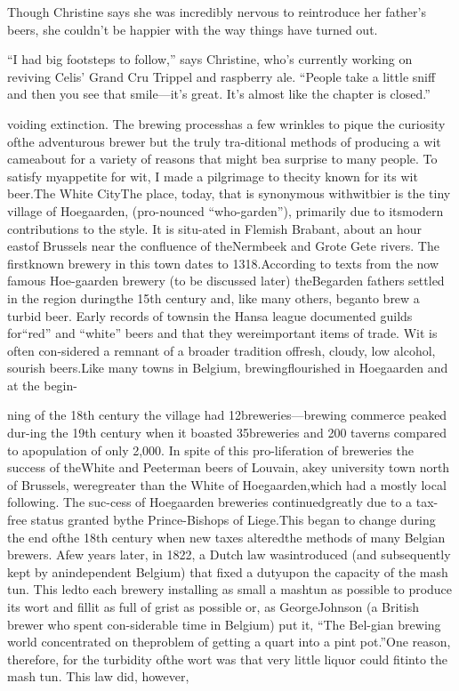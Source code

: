\documentclass[a4paper,parskip=half]{scrartcl}
\begin{document}
Though Christine says she was incredibly nervous to reintroduce her father’s beers, she couldn’t be happier with the way things have turned out.

“I had big footsteps to follow,” says Christine, who’s currently working on reviving Celis’ Grand Cru Trippel and raspberry ale. “People take a little sniff and then you see that smile—it’s great. It’s almost like the chapter is closed.”

\parencite[27]{Sparrow2002} 

voiding extinction. The brewing processhas a few wrinkles to pique the curiosity ofthe adventurous brewer but the truly tra-ditional methods of producing a wit cameabout for a variety of reasons that might bea surprise to many people. To satisfy myappetite for wit, I made a pilgrimage to thecity known for its wit beer.The White CityThe place, today, that is synonymous withwitbier is the tiny village of Hoegaarden, (pro-nounced “who-garden”), primarily due to itsmodern contributions to the style. It is situ-ated in Flemish Brabant, about an hour eastof Brussels near the confluence of theNermbeek and Grote Gete rivers. The firstknown brewery in this town dates to 1318.According to texts from the now famous Hoe-gaarden brewery (to be discussed later) theBegarden fathers settled in the region duringthe 15th century and, like many others, beganto brew a turbid beer. Early records of townsin the Hansa league documented guilds for“red” and “white” beers and that they wereimportant items of trade. Wit is often con-sidered a remnant of a broader tradition offresh, cloudy, low alcohol, sourish beers.Like many towns in Belgium, brewingflourished in Hoegaarden and at the begin-

ning of the 18th century the village had 12breweries—brewing commerce peaked dur-ing the 19th century when it boasted 35breweries and 200 taverns compared to apopulation of only 2,000. In spite of this pro-liferation of breweries the success of theWhite and Peeterman beers of Louvain, akey university town north of Brussels, weregreater than the White of Hoegaarden,which had a mostly local following. The suc-cess of Hoegaarden breweries continuedgreatly due to a tax-free status granted bythe Prince-Bishops of Liege.This began to change during the end ofthe 18th century when new taxes alteredthe methods of many Belgian brewers. Afew years later, in 1822, a Dutch law wasintroduced (and subsequently kept by anindependent Belgium) that fixed a dutyupon the capacity of the mash tun. This ledto each brewery installing as small a mashtun as possible to produce its wort and fillit as full of grist as possible or, as GeorgeJohnson (a British brewer who spent con-siderable time in Belgium) put it, “The Bel-gian brewing world concentrated on theproblem of getting a quart into a pint pot.”One reason, therefore, for the turbidity ofthe wort was that very little liquor could fitinto the mash tun. This law did, however,
\end{document}
